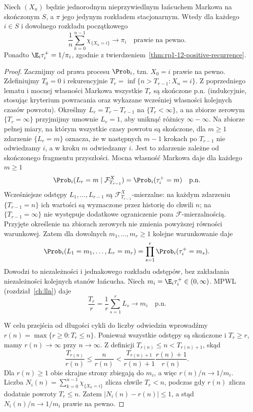 \begin{twierdzenie}
Niech $(X_n)$ będzie jednorodnym nieprzywiedlnym
łańcuchem Markowa na skończonym $S$, a $\pi$
jego jedynym rozkładem stacjonarnym. Wtedy
dla każdego $i\in S$ i dowolnego rozkładu
początkowego
\[
\frac1n\sum_{k=0}^{n-1}\chi_{\{X_k=i\}}
\longrightarrow\pi_i\quad\text{prawie na pewno}.
\]
Ponadto $\E_i\tau_i^+=1/\pi_i$, zgodnie
z twierdzeniem~\ref{thm:rp1-12-positive-recurrence}.
\end{twierdzenie}
\begin{proof}
Zacznijmy od prawa procesu $\Prob_i$, tzn.
$X_0=i$ prawie na pewno. Zdefiniujmy $T_0=0$ i
rekurencyjnie $T_r=\inf\{n>T_{r-1}:X_n=i\}$.
Z poprzedniego lematu i mocnej własności Markowa
wszystkie $T_r$ są skończone p.n. (indukcyjnie,
stosując kryterium powracania oraz wykazane wcześniej
własności kolejnych czasów powrotu).
Określmy $L_r=T_r-T_{r-1}$ na $\{T_r<\infty\}$,
a na zbiorze zerowym $\{T_r=\infty\}$ przyjmijmy
umownie $L_r=1$, aby uniknąć różnicy $\infty-\infty$.
Na zbiorze pełnej miary, na którym wszystkie
czasy powrotu są skończone, dla $m\geq1$
zdarzenie $\{L_r=m\}$ oznacza, że w następnych
$m-1$ krokach po $T_{r-1}$ nie odwiedzamy $i$,
a w kroku $m$ odwiedzamy $i$. Jest to zdarzenie zależne od
skończonego fragmentu przyszłości. Mocna własność
Markowa daje dla każdego $m\geq1$
\[
\Prob_i(L_r=m\mid\mathcal F_{T_{r-1}}^X)
=\Prob_i(\tau_i^+=m)\quad\text{p.n.}
\]
Wcześniejsze odstępy $L_1,\ldots,L_{r-1}$ są
$\mathcal F_{T_{r-1}}^X$-mierzalne: na każdym
zdarzeniu $\{T_{r-1}=n\}$ ich wartości są
wyznaczone przez historię do chwili $n$;
na $\{T_{r-1}=\infty\}$ nie występuje dodatkowe
ograniczenie poza $\mathcal F$-mierzalnością.
Przyjęte określenie na zbiorach zerowych
nie zmienia powyższej równości warunkowej. Zatem dla dowolnych
$m_1,\ldots,m_r\geq1$ kolejne warunkowanie daje
\[
\Prob_i(L_1=m_1,\ldots,L_r=m_r)
=\prod_{s=1}^r\Prob_i(\tau_i^+=m_s).
\]
Dowodzi to niezależności i jednakowego rozkładu
odstępów, bez zakładania niezależności kolejnych
stanów łańcucha.
Niech $m_i=\E_i\tau_i^+\in(0,\infty)$.
MPWL (rozdział~\ref{ch:lln}) daje
\[
 \frac{T_r}{r}=\frac1r\sum_{s=1}^rL_s
 \longrightarrow m_i\quad\text{p.n.}
\]

W celu przejścia od długości cykli do liczby
odwiedzin wprowadźmy
$r(n)=\max\{r\geq0:T_r\leq n\}$.
Ponieważ wszystkie odstępy są skończone i
$T_r\geq r$, mamy $r(n)\to\infty$ przy $n\to\infty$.
Z definicji $T_{r(n)}\leq n<T_{r(n)+1}$, skąd
\[
 \frac{T_{r(n)}}{r(n)}
 \leq\frac n{r(n)}
 <\frac{T_{r(n)+1}}{r(n)+1}
   \frac{r(n)+1}{r(n)}.
\]
Dla $r(n)\geq1$ obie skrajne strony zbiegają
do $m_i$, a więc $r(n)/n\to1/m_i$.
Liczba $N_i(n)=\sum_{k=0}^{n-1}\chi_{\{X_k=i\}}$
zlicza chwile $T_r<n$, podczas gdy $r(n)$
zlicza dodatnie powroty $T_r\leq n$.
Zatem $|N_i(n)-r(n)|\leq1$, a stąd
$N_i(n)/n\to1/m_i$ prawie na pewno.


\end{proof}
